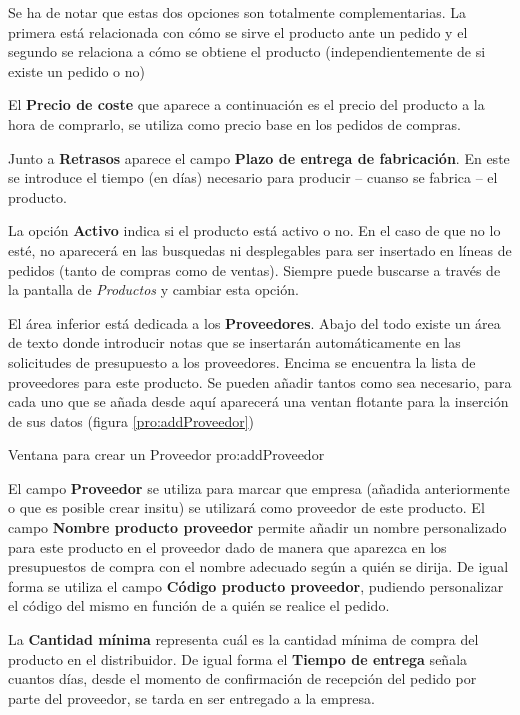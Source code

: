 Se ha de notar que estas dos opciones son totalmente complementarias. La primera está relacionada con cómo se sirve el producto ante un pedido y el segundo se relaciona a cómo se obtiene el producto (independientemente de si existe un pedido o no)

El \textbf{Precio de coste} que aparece a continuación es el precio del producto a la hora de comprarlo, se utiliza como precio base en los pedidos de compras.

Junto a \textbf{Retrasos} aparece el campo \textbf{Plazo de entrega de fabricación}. En este se introduce el tiempo (en días) necesario para producir -- cuanso se fabrica -- el producto.

La opción \textbf{Activo} indica si el producto está activo o no. En el caso de que no lo esté, no aparecerá en las busquedas ni desplegables para ser insertado en líneas de pedidos (tanto de compras como de ventas). Siempre puede buscarse a través de la pantalla de \emph{Productos} y cambiar esta opción.

El área inferior está dedicada a los \textbf{Proveedores}. Abajo del todo existe un área de texto donde introducir notas que se insertarán automáticamente en las solicitudes de presupuesto a los proveedores. Encima se encuentra la lista de proveedores para este producto. Se pueden añadir tantos como sea necesario, para cada uno que se añada desde aquí aparecerá una ventan flotante para la inserción de sus datos (figura \ref{pro:addProveedor})

{Ventana para crear un Proveedor}
{pro:addProveedor}

El campo \textbf{Proveedor} se utiliza para marcar que empresa (añadida anteriormente o que es posible crear insitu) se utilizará como proveedor de este producto. El campo \textbf{Nombre producto proveedor} permite añadir un nombre personalizado para este producto en el proveedor dado de manera que aparezca en los presupuestos de compra con el nombre adecuado según a quién se dirija. De igual forma se utiliza el campo \textbf{Código producto proveedor}, pudiendo personalizar el código del mismo en función de a quién se realice el pedido.

La \textbf{Cantidad mínima} representa cuál es la cantidad mínima de compra del producto en el distribuidor. De igual forma el \textbf{Tiempo de entrega} señala cuantos días, desde el momento de confirmación de recepción del pedido por parte del proveedor, se tarda en ser entregado a la empresa.

